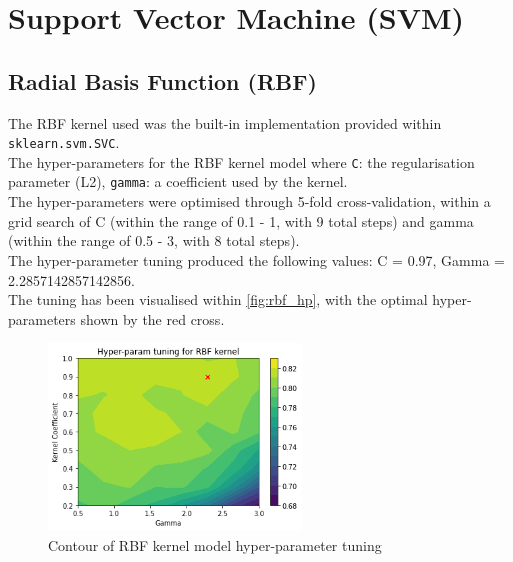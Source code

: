 \section{Support Vector Machine (SVM)}

\subsection{Radial Basis Function (RBF)}





The RBF kernel used was the built-in implementation provided within \verb|sklearn.svm.SVC|.\\
The hyper-parameters for the RBF kernel model where \verb|C|: the regularisation parameter (L2), \verb|gamma|: a coefficient used by the kernel.\\
The hyper-parameters were optimised through 5-fold cross-validation, within a grid search of C (within the range of 0.1 - 1, with 9 total steps) and gamma (within the range of 0.5 - 3, with 8 total steps).\\
The hyper-parameter tuning produced the following values: C = 0.97, Gamma = 2.2857142857142856.\\
The tuning has been visualised within \autoref{fig:rbf_hp}, with the optimal hyper-parameters shown by the red cross.
\begin{figure}[h!]
    \centering
    \includegraphics[width=0.6\textwidth]{figures/final/rbf.png}
    \caption{\label{fig:rbf_hp} Contour of RBF kernel model hyper-parameter tuning}
\end{figure}

